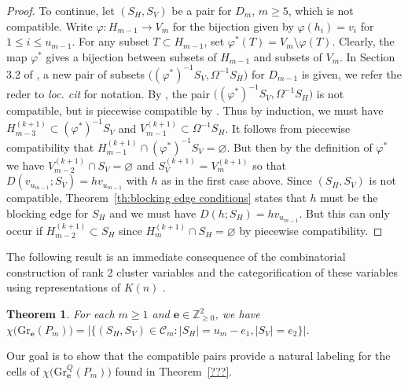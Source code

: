 \documentclass{amsart}
\newtheorem{theorem}{Theorem}[section]
\numberwithin{equation}{section}
\newcommand{\bfe}{\mathbf{e}}
\newcommand{\cC}{\mathcal{C}}
\newcommand{\Gr}{\mathrm{Gr}}
\newcommand{\ZZ}{\mathbb{Z}}
\begin{document}
\begin{proof}
  To continue, let $(S_H,S_V)$ be a pair for $D_m$, $m\ge5$, which is not compatible.
  Write $\varphi:H_{m-1}\to V_m$ for the bijection given by $\varphi(h_i)=v_i$ for $1\le i\le u_{m-1}$.
  For any subset $T\subset H_{m-1}$, set $\varphi^*(T)=V_m\setminus\varphi(T)$.
  Clearly, the map $\varphi^*$ gives a bijection between subsets of $H_{m-1}$ and subsets of $V_m$.
  In Section 3.2 of \cite{rupel}, a new pair of subsets $\big((\varphi^*)^{-1}S_V,\Omega^{-1}S_H\big)$ for $D_{m-1}$ is given, we refer the reder to \emph{loc. cit} for notation.
  By \cite[Proposition 3.10]{rupel}, the pair $\big((\varphi^*)^{-1}S_V,\Omega^{-1}S_H\big)$ is not compatible, but is piecewise compatible by \cite[proposition 3.16]{rupel}.
  Thus by induction, we must have $H_{m-3}^{(k+1)}\subset(\varphi^*)^{-1}S_V$ and $V_{m-1}^{(k+1)}\subset\Omega^{-1}S_H$.
  It follows from piecewise compatibility that $H_{m-1}^{(k+1)}\cap(\varphi^*)^{-1}S_V=\varnothing$.
  But then by the definition of $\varphi^*$ we have $V_{m-2}^{(k+1)}\cap S_V=\varnothing$ and $S_V^{(k+1)}=V_m^{(k+1)}$ so that $D(v_{u_{m-1}};S_V)=hv_{u_{m-1}}$ with $h$ as in the first case above.
  Since $(S_H,S_V)$ is not compatible, Theorem~\ref{th:blocking edge conditions} states that $h$ must be the blocking edge for $S_H$ and we must have $D(h;S_H)=hv_{u_{m-1}}$.
  But this can only occur if $H_{m-2}^{(k+1)}\subset S_H$ since $H_m^{(k+1)}\cap S_H=\varnothing$ by piecewise compatibility.
\end{proof}


The following result is an immediate consequence of the combinatorial construction of rank 2 cluster variables \cite{lee-li-zelevinsky} and the categorification of these variables using representations of $K(n)$ \cite{cc,caldero-keller}.
\begin{theorem}\cite{lee-li-zelevinsky}
  For each $m\ge1$ and $\bfe\in\ZZ_{\ge0}^2$, we have $\chi\big(\Gr_\bfe(P_m)\big)=\big|\{(S_H,S_V)\in\cC_m:|S_H|=u_m-e_1,|S_V|=e_2\}\big|$.
\end{theorem}

Our goal is to show that the compatible pairs provide a natural labeling for the cells of $\chi\big(\Gr^Q_\bfe(P_m)\big)$ found in Theorem~\ref{???}.
\end{document}
